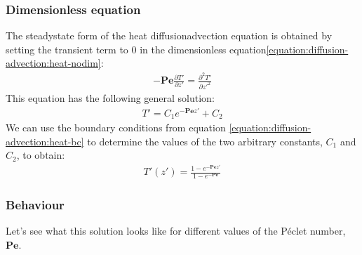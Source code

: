 \documentclass[letterpaper,10pt,english]{jupyterBook}
\begin{document}
\subsubsection{Dimensionless equation}
\label{\detokenize{solution:dimensionless-equation}}
\sphinxAtStartPar
The steady\sphinxhyphen{}state form of the heat diffusion\sphinxhyphen{}advection equation is obtained by setting the transient term to 0 in the dimensionless equation\eqref{equation:diffusion-advection:heat-nodim}:
\begin{equation*}
\begin{split}-\mathbf{Pe}\frac{\partial T'}{\partial z'}=\frac{\partial^2T'}{\partial z'^2}\end{split}
\end{equation*}
\sphinxAtStartPar
This equation has the following general solution:
\begin{equation*}
\begin{split}T'=C_1e^{-\mathbf{Pe}z'}+C_2\end{split}
\end{equation*}
\sphinxAtStartPar
We can use the boundary conditions from equation \eqref{equation:diffusion-advection:heat-bc} to determine the values of the two arbitrary constants, \(C_1\) and \(C_2\), to obtain:
\begin{equation*}
\begin{split}T'(z')=\frac{1-e^{-\mathbf{Pe}z'}}{1-e^{-\mathbf{Pe}}}\end{split}
\end{equation*}

\subsubsection{Behaviour}
\label{\detokenize{solution:behaviour}}
\sphinxAtStartPar
Let’s see what this solution looks like for different values of the Péclet number, \(\mathbf{Pe}\).
\end{document}
